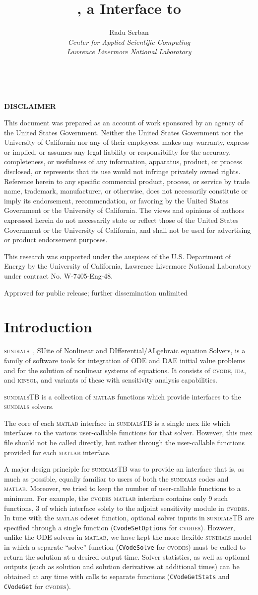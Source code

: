 \documentclass[titlepage,10pt]{article}
\title{{\sundialsTB}, a {\matlab} Interface to {\sundials}}
\author{
  Radu Serban \\ 
  {\em Center for Applied Scientific Computing} \\ 
  {\em Lawrence Livermore National Laboratory}
}
\date{\STBdate \\ \vfill \STBucrl}
\newcommand{\disclaimer}{%
\changetext{.625in}{}{}{}{}
\thispagestyle{empty}%
\vglue5\baselineskip
\begin{center}
{\bf DISCLAIMER}
\end{center}
\noindent
This document was prepared as an account of work sponsored by an agency of the
United States Government.  Neither the United States Government nor the University
of California nor any of their employees, makes any warranty, express or implied,
or assumes any legal liability or responsibility for the accuracy, completeness,
or usefulness of any information, apparatus, product, or process disclosed, or
represents that its use would not infringe privately owned rights. Reference
herein to any specific commercial product, process, or service by trade name,
trademark, manufacturer, or otherwise, does not necessarily constitute or imply
its endorsement, recommendation, or favoring by the United States Government
or the University of California.  The views and opinions of authors expressed
herein do not necessarily state or reflect those of the United States Government
or the University of California, and shall not be used for advertising or
product endorsement purposes.

\vskip2\baselineskip
This research was supported under the auspices of the U.S. Department of Energy by
the University of California, Lawrence Livermore National Laboratory under
contract No.  W-7405-Eng-48.
\vfill
\begin{center}
Approved for public release; further dissemination unlimited
\end{center}
\clearpage
\changetext{-.625in}{}{}{}{}
}
\newcommand{\clearemptydoublepage}{\newpage{\pagestyle{empty}\cleardoublepage}}
\newcommand{\sundialsTB}{{\normalfont\scshape sundialsTB}}
\newcommand{\sundials}{{\normalfont\scshape sundials}}
\newcommand{\cvode}{{\normalfont\scshape cvode}}
\newcommand{\cvodes}{{\normalfont\scshape cvodes}}
\newcommand{\ida}{{\normalfont\scshape ida}}
\newcommand{\kinsol}{{\normalfont\scshape kinsol}}
\newcommand{\matlab}{{\normalfont\scshape matlab}}
\begin{document}
\pagestyle{empty}
\maketitle
\disclaimer

\tableofcontents

\clearemptydoublepage

\pagestyle{plain}

\section{Introduction}

{\sundials}~\cite{HBGLSSW:04}, SUite of Nonlinear and DIfferential/ALgebraic equation Solvers,
is a family of software tools for integration of ODE and DAE initial value problems
and for the solution of nonlinear systems of equations.
It consists of {\cvode}, {\ida}, and {\kinsol}, and variants of these with 
sensitivity analysis capabilities.

{\sundialsTB} is a collection of {\matlab} functions which provide interfaces to
the {\sundials} solvers.

The core of each {\matlab} interface in {\sundialsTB} is a single {\sc mex} 
file which interfaces to the various user-callable functions for that solver.
However, this {\sc mex} file should not be called directly, but rather through the 
user-callable functions provided for each {\matlab} interface.

A major design principle for {\sundialsTB}
was to provide an interface that is, as much as possible, equally familiar to
users of both the {\sundials} codes and {\matlab}. Moreover, we tried to keep the
number of user-callable functions to a minimum. For example, the {\cvodes} {\matlab} 
interface contains only 9 such functions, 3 of which interface solely to the adjoint
sensitivity module in {\cvodes}. In tune with the {\matlab} {\sc odeset} function, optional
solver inputs in {\sundialsTB} are specified through a single function
({\tt CvodeSetOptions} for {\cvodes}). However, unlike the ODE solvers in {\matlab}, we
have kept the more flexible {\sundials} model in which a separate ``solve'' function 
({\tt CVodeSolve} for {\cvodes}) must be called to return the solution at a desired 
output time. Solver statistics, as well as optional outputs (such as
solution and solution derivatives at additional times) can be obtained at any time
with calls to separate functions ({\tt CVodeGetStats} and {\tt CVodeGet} for {\cvodes}).
\end{document}
